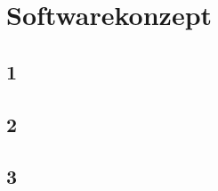 \section{Softwarekonzept} \label{sec:softwarekonzept}

\subsection{1} \label{subsec:1}

\subsection{2} \label{subsec:2}

\subsection{3} \label{subsec:3}

\newpage
